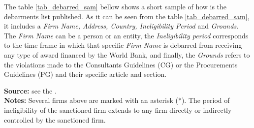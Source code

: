 The table \ref{tab_debarred_sam} bellow shows a short sample of how is the debarments list published. As it can be seen from the table \ref{tab_debarred_sam}, it includes a \textit{Firm Name, Address, Country, Ineligibility Period} and \textit{Grounds}. The \textit{Firm Name} can be a person or an entity, the \textit{Ineligibility period} corresponds to the time frame in which that specific \textit{Firm Name} is debarred from receiving any type of award financed by the World Bank, and finally, the \textit{Grounds} refers to the violations made to the Consultants Guidelines (CG) or the Procurements Guidelines (PG) and their specific article and section.

\begin{table}[H]
\caption{Debarred Firms and Individuals (sample)}
\label{tab_debarred_sam}
\footnotesize{\textbf{Source:} see the \cite{wb_debarment}.\\ \textbf{Notes:} Several firms above are marked with an asterisk (*). The period of ineligibility of the sanctioned firm extends to any firm directly or indirectly controlled by the sanctioned firm.}
\end{table}


